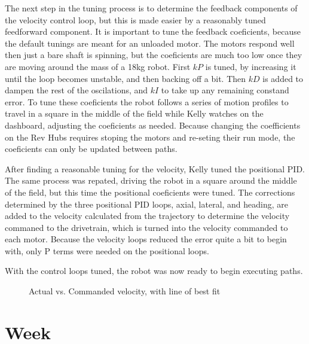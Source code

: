 \documentclass{article}
\begin{document}
The next step in the tuning process is to determine the feedback components of the velocity control loop, but this is made easier by a reasonably tuned feedforward component. It is important to tune the feedback coeficients, because the default tunings are meant for an unloaded motor. The motors respond well then just a bare shaft is spinning, but the coeficients are much too low once they are moving around the mass of a 18kg robot. First $kP$ is tuned, by increasing it until the loop becomes unstable, and then backing off a bit. Then $kD$ is added to dampen the rest of the oscilations, and $kI$ to take up any remaining constand error. To tune these coeficients the robot follows a series of motion profiles to travel in a square in the middle of the field while Kelly watches on the dashboard, adjusting the coeficients as needed. Because changing the coefficients on the Rev Hubs requires stoping the motors and re-seting their run mode, the coeficients can only be updated between paths.

After finding a reasonable tuning for the velocity, Kelly tuned the positional PID. The same process was repated, driving the robot in a square around the middle of the field, but this time the positional coeficients were tuned. The corrections determined by the three positional PID loops, axial, lateral, and heading, are added to the velocity calculated from the trajectory to determine the velocity commaned to the drivetrain, which is turned into the velocity commanded to each motor. Because the velocity loops reduced the error quite a bit to begin with, only P terms were needed on the positional loops. 

With the control loops tuned, the robot was now ready to begin executing paths.

\begin {figure}
\centering
{}
\caption {Actual vs. Commanded velocity, with line of best fit}
\label {fig:graph}
\end{figure}
\clearpage \newpage \section{Week \thesection} 
\end{document}
